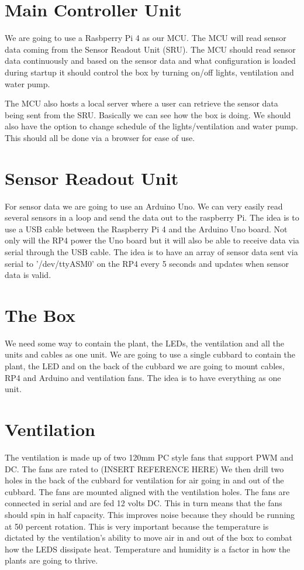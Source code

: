 \documentclass[a4paper,12pt,twoside,openright,titlepage]{book}
\begin{document}
\section{Main Controller Unit}

We are going to use a Rasbperry Pi 4 as our MCU. 
The MCU will read sensor data coming from the Sensor Readout Unit (SRU).
The MCU should read sensor data continuously and based on the sensor data and what configuration is loaded during startup it should control the box by turning on/off lights, ventilation and water pump.

The MCU also hosts a local server where a user can retrieve the sensor data being sent from the SRU. Basically we can see how the box is doing.
We should also have the option to change schedule of the lights/ventilation and water pump. This should all be done via a browser for ease of use.

\section{Sensor Readout Unit}

For sensor data we are going to use an Arduino Uno. We can very easily read several sensors in a loop and send the data out to the raspberry Pi. The idea is to use a USB cable between the Raspberry Pi 4 and the Arduino Uno board. Not only will the RP4 power the Uno board but it will also be able to receive data via serial through the USB cable. The idea is to have an array of sensor data sent via serial to '/dev/ttyASM0' on the RP4 every 5 seconds and updates when sensor data is valid.

\section{The Box}

We need some way to contain the plant, the LEDs, the ventilation and all the units and cables as one unit. We are going to use a single cubbard to contain the plant, the LED and on the back of the cubbard we are going to mount cables, RP4 and Arduino and ventilation fans. The idea is to have everything as one unit.

\section{Ventilation}
The ventilation is made up of two 120mm PC style fans that support PWM and DC. The fans are rated to (INSERT REFERENCE HERE)
We then drill two holes in the back of the cubbard for ventilation for air going in and out of the cubbard. The fans are mounted aligned with the ventilation holes. The fans are connected in serial and are fed 12 volts DC. This in turn means that the fans should spin in half capacity. This improves noise because they should be running at 50 percent rotation. This is very important because the temperature is dictated by the ventilation's ability to move air in and out of the box to combat how the LEDS dissipate heat. Temperature and humidity is a factor in how the plants are going to thrive.
\end{document}
